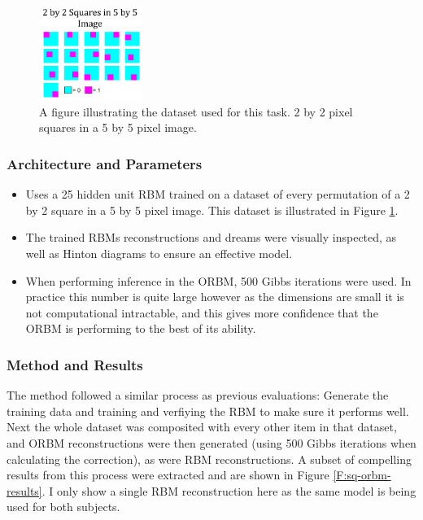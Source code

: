 \begin{figure}[htb]
  \begin{center}
    \includegraphics[width=0.3\textwidth]{Assets/results/sq-dataset.png}
  \end{center}
  \caption{A figure illustrating the dataset used for this task. 2 by 2 pixel squares in a 5 by 5 pixel image.}
  \label{F:Sq-Dataset}
\end{figure}

\subsubsection{Architecture and Parameters}
\begin{itemize}
  \item Uses a 25 hidden unit RBM trained on a dataset of every permutation of a 2 by 2 square in a 5 by 5 pixel image. This dataset is illustrated in Figure \ref{F:Sq-Dataset}.
  \item The trained RBMs reconstructions and dreams were visually inspected, as well as Hinton diagrams to ensure an effective model.
  \item When performing inference in the ORBM, 500 Gibbs iterations were used. In practice this number is quite large however as the dimensions are small it is not computational intractable, and this gives more confidence that the ORBM is performing to the best of its ability.
\end{itemize}

\subsubsection{Method and Results}

The method followed a similar process as previous evaluations: Generate the training data and training and verfiying the RBM to make sure it performs well.
Next the whole dataset was composited with every other item in that dataset, and ORBM reconstructions were then generated (using 500 Gibbs iterations when calculating the correction), as were RBM reconstructions.
A subset of compelling results from this process were extracted and are shown in Figure \ref{F:sq-orbm-results}. I only show a single RBM reconstruction here as the same model is being used for both subjects.

